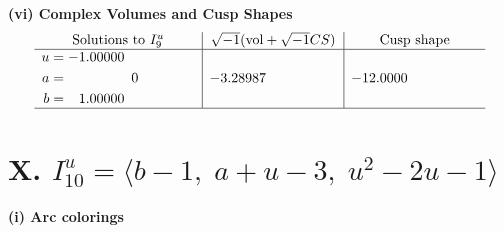 \documentclass[1p]{elsarticle_modified}
\theoremstyle{definition}
\newcommand{\I}{\sqrt{-1}}
\begin{document}
\newpage\flushleft \textbf{(vi) Complex Volumes and Cusp Shapes}
$$\begin{array}{c|c|c}  
\text{Solutions to }I^u_{9}& \I (\text{vol} + \sqrt{-1}CS) & \text{Cusp shape}\\
 \hline 
\begin{aligned}
u &= -1.00000\phantom{ +0.000000I} \\
a &= \phantom{-0.000000 } 0 \\
b &= \phantom{-}1.00000\phantom{ +0.000000I}\end{aligned}
 & -3.28987\phantom{ +0.000000I} & -12.0000\phantom{ +0.000000I}\\
 \hline 
 \end{array}$$\newpage\newpage\renewcommand{\arraystretch}{1}
\centering \section*{X. $I^u_{10}= \langle b-1,\;a+u-3,\;u^2-2 u-1 \rangle$}
\flushleft \textbf{(i) Arc colorings}\\
\end{document}

